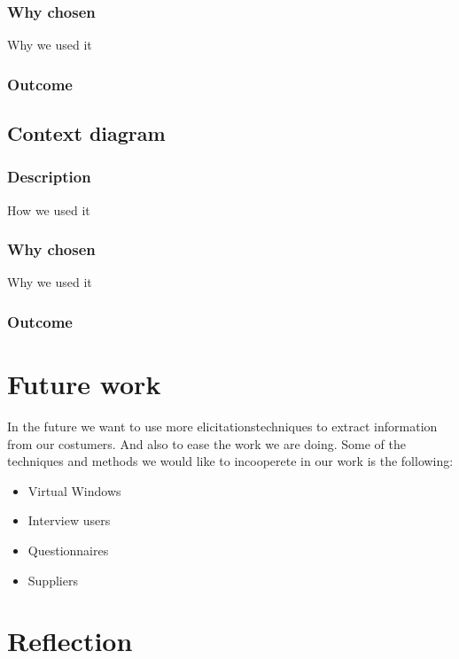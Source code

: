 \documentclass[a4paper]{article}
\begin{document}
    \subsubsection{Why chosen}
    Why we used it
    \subsubsection{Outcome}

    \subsection{Context diagram}


    \subsubsection{Description}
    How we used it
    \subsubsection{Why chosen}
    Why we used it
    \subsubsection{Outcome}

  \section{Future work}

  In the future we want to use more elicitationstechniques to extract information from our costumers. And also to ease the work we are doing.
  Some of the techniques and methods we would like to incooperete in our work is the following:
  \begin{itemize}
  	\item Virtual Windows
  	\item Interview users
  	\item Questionnaires
  	\item Suppliers 
  \end{itemize}
 
  \section{Reflection}
\end{document}
